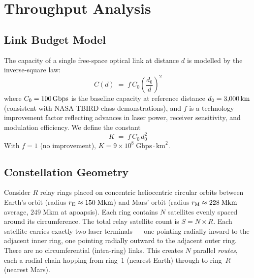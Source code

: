 \section{Throughput Analysis}
\label{sec:throughput}



\subsection{Link Budget Model}
\label{sec:link-budget}


The capacity of a single free-space optical link at distance $d$ is modelled by the
inverse-square law:
%
\begin{equation}\label{eq:link-capacity}
  C(d) \;=\; f \, C_0 \left(\frac{d_0}{d}\right)^{\!2}
\end{equation}
%
where $C_0 = 100\,\text{Gbps}$ is the baseline capacity at reference distance
$d_0 = 3{,}000\,\text{km}$ (consistent with NASA TBIRD-class demonstrations), and $f$ is a
technology improvement factor reflecting advances in laser power, receiver sensitivity,
and modulation efficiency. We define the constant
%
\begin{equation}\label{eq:K}
  K \;=\; f \, C_0 \, d_0^2
\end{equation}
%
With $f = 1$ (no improvement), $K = 9 \times 10^{8}\;\text{Gbps}\cdot\text{km}^2$.


\subsection{Constellation Geometry}
\label{sec:geometry}


Consider $R$ relay rings placed on concentric heliocentric circular orbits between
Earth's orbit (radius $r_{\mathrm{E}} \approx 150\;\text{Mkm}$) and Mars' orbit
(radius $r_{\mathrm{M}} \approx 228\;\text{Mkm}$ average, $249\;\text{Mkm}$ at apoapsis). Each ring contains $N$ satellites
evenly spaced around its circumference. The total relay satellite count is $S = N \times R$.
Each satellite carries exactly two laser terminals --- one pointing radially inward to the
adjacent inner ring, one pointing radially outward to the adjacent outer ring. There are
no circumferential (intra-ring) links. This creates $N$ parallel \emph{routes}, each a
radial chain hopping from ring~1 (nearest Earth) through to ring~$R$ (nearest Mars).

